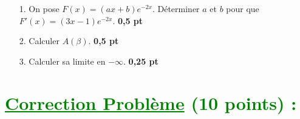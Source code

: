 \documentclass[12pt]{article}
\begin{document}
\begin{itemize}
    \item[1.] On pose $F(x) = (ax + b)e^{-2x}$. Déterminer $a$ et $b$ pour que $F'(x) = (3x - 1)e^{-2x}$. \textbf{0,5 pt}
    \item[2.] Calculer $A(\beta)$. \textbf{0,5 pt}
    \item[3.] Calculer sa limite en $-\infty$. \textbf{0,25 pt}
\end{itemize}
\section*{\textcolor{green}{\underline{Correction Problème} (10 points) :}}
\end{document}

